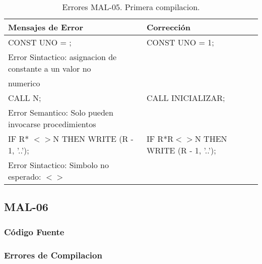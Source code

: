 \documentclass[a4paper,12pt]{article}
\begin{document}
\begin{table}[H]
\centering
\begin{tabular}{|l|l|}
\hline
Mensajes de Error & Corrección\\
\hline
CONST UNO = ;												& CONST UNO = 1;\\
Error Sintactico: asignacion de constante a un valor no 		&\\
numerico														&\\
\hline
CALL N;														& CALL INICIALIZAR;\\
Error Semantico: Solo pueden invocarse procedimientos		&\\
\hline
IF R* $<>$N THEN WRITE (R - 1, '..');						& IF R*R$<>$N THEN WRITE (R - 1, '..');\\
Error Sintactico: Simbolo no esperado: $<>$					&\\
\hline
\end{tabular}
\caption{Errores MAL-05. Primera compilacion.}
\label{MAL-05-1}
\end{table}


\subsection{MAL-06}
\subsubsection{Código Fuente}

\subsubsection{Errores de Compilacion}
\end{document}
